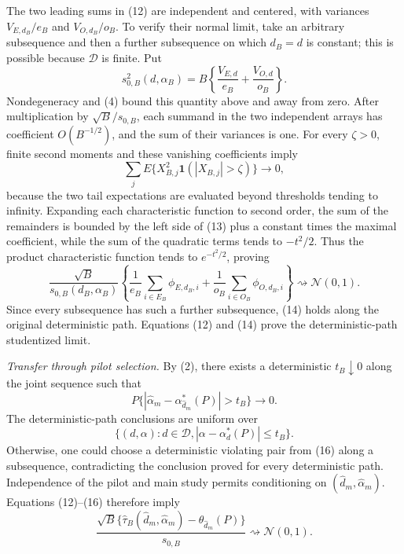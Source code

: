 The two leading sums in (12) are independent and centered, with variances \(V_{E,d_B}/e_B\) and \(V_{O,d_B}/o_B\).  To verify their normal limit, take an arbitrary subsequence and then a further subsequence on which \(d_B=d\) is constant; this is possible because \(\mathcal D\) is finite.  Put
\[
 s_{0,B}^2(d,\alpha_B)
 =B\left\{\frac{V_{E,d}}{e_B}+\frac{V_{O,d}}{o_B}\right\}.
\]
Nondegeneracy and (4) bound this quantity above and away from zero.  After multiplication by \(\sqrt B/s_{0,B}\), each summand in the two independent arrays has coefficient \(O(B^{-1/2})\), and the sum of their variances is one.  For every \(\zeta>0\), finite second moments and these vanishing coefficients imply
\[
 \sum_j E\{X_{B,j}^2\mathbf1(|X_{B,j}|>\zeta)\}\longrightarrow0, \tag{13}
\]
because the two tail expectations are evaluated beyond thresholds tending to infinity.  Expanding each characteristic function to second order, the sum of the remainders is bounded by the left side of (13) plus a constant times the maximal coefficient, while the sum of the quadratic terms tends to \(-t^2/2\).  Thus the product characteristic function tends to \(e^{-t^2/2}\), proving
\[
 \frac{\sqrt B}{s_{0,B}(d_B,\alpha_B)}
 \left\{
 \frac1{e_B}\sum_{i\in E_B}\phi_{E,d_B,i}
 +\frac1{o_B}\sum_{i\in O_B}\phi_{O,d_B,i}
 \right\}
 \rightsquigarrow\mathcal N(0,1).                             \tag{14}
\]
Since every subsequence has such a further subsequence, (14) holds along the original deterministic path.  Equations (12) and (14) prove the deterministic-path studentized limit.

\emph{Transfer through pilot selection.}
By (2), there exists a deterministic \(t_B\downarrow0\) along the joint sequence such that
\[
 P\{|\widehat\alpha_m-\alpha_{\widehat d_m}^*(P)|>t_B\}
 \longrightarrow0.                                           \tag{15}
\]
The deterministic-path conclusions are uniform over
\[
 \{(d,\alpha):d\in\mathcal D,
 |\alpha-\alpha_d^*(P)|\le t_B\}.                             \tag{16}
\]
Otherwise, one could choose a deterministic violating pair from (16) along a subsequence, contradicting the conclusion proved for every deterministic path.  Independence of the pilot and main study permits conditioning on \((\widehat d_m,\widehat\alpha_m)\).  Equations (12)--(16) therefore imply
\[
 \frac{\sqrt B\{\widehat\tau_B(\widehat d_m,\widehat\alpha_m)
 -\theta_{\widehat d_m}(P)\}}{s_{0,B}}
 \rightsquigarrow\mathcal N(0,1).                             \tag{17}
\]

